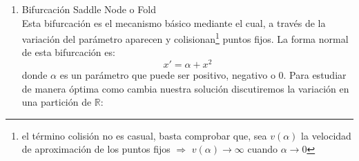  \begin{enumerate}
 	\item Bifurcación Saddle Node o Fold\\
 	Esta bifurcación es el mecanismo básico mediante el cual, a través de la variación del parámetro aparecen y colisionan\footnote{el término colisión no es casual, basta comprobar que, sea $v(\alpha)$ la velocidad de aproximación de los puntos fijos $\Rightarrow$ $v(\alpha) \rightarrow \infty $ cuando $\alpha \rightarrow 0$} puntos fijos. 
 	La forma normal de esta bifurcación es:
 	\begin{equation}
 	x'=\alpha+x^2
 	\label{sadd}
 	\end{equation}
 	donde $\alpha$ es un parámetro que puede ser positivo, negativo o 0.
 	Para estudiar de manera óptima como cambia nuestra solución discutiremos la variación en una partición de $\mathbb{R}$:\\
 

\end{enumerate}
